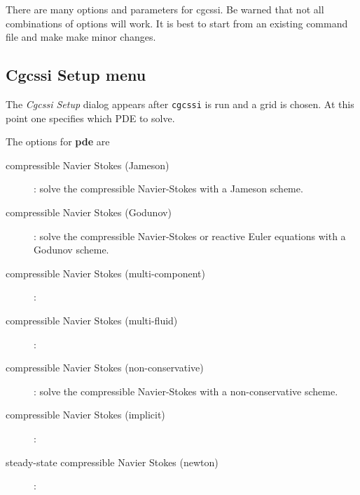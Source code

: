 \documentclass{article}
\newcommand{\solver}{cgcssi}
\begin{document}
There are many options and parameters for \solver. Be warned that not all
combinations of options will work.  It is best to start from an existing command
file and make make minor changes.


\subsection{Cgcssi Setup menu}\label{sec:setupDialog}

The {\em  Cgcssi Setup} dialog appears after {\tt cgcssi} is run and a grid is chosen.
At this point one specifies which PDE to solve.


\noindent The options for {\bf pde} are
\begin{description}
  \item[\qquad compressible Navier Stokes (Jameson)] : solve the compressible Navier-Stokes with a Jameson scheme.
  \item[\qquad compressible Navier Stokes (Godunov)] : solve the compressible Navier-Stokes or reactive Euler equations with a Godunov scheme.
  \item[\qquad compressible Navier Stokes (multi-component)] : 
  \item[\qquad compressible Navier Stokes (multi-fluid)] : 
  \item[\qquad compressible Navier Stokes (non-conservative)] : solve the compressible Navier-Stokes with a non-conservative scheme.
  \item[\qquad compressible Navier Stokes (implicit)] : 
  \item[\qquad steady-state compressible Navier Stokes (newton) ] :
\end{description}

\end{document}
